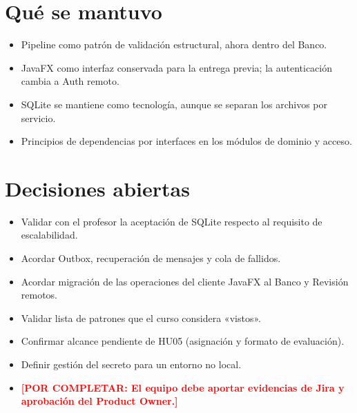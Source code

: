 \documentclass[12pt,a4paper]{article}
\newcommand{\pendiente}[1]{\textcolor{red}{\textbf{[POR COMPLETAR: #1]}}}
\begin{document}
\section{Qué se mantuvo}
\begin{itemize}[leftmargin=*]
\item Pipeline como patrón de validación estructural, ahora dentro del Banco.
\item JavaFX como interfaz conservada para la entrega previa; la autenticación cambia a Auth remoto.
\item SQLite se mantiene como tecnología, aunque se separan los archivos por servicio.
\item Principios de dependencias por interfaces en los módulos de dominio y acceso.
\end{itemize}

\section{Decisiones abiertas}
\begin{itemize}[leftmargin=*]
\item Validar con el profesor la aceptación de SQLite respecto al requisito de escalabilidad.
\item Acordar Outbox, recuperación de mensajes y cola de fallidos.
\item Acordar migración de las operaciones del cliente JavaFX al Banco y Revisión remotos.
\item Validar lista de patrones que el curso considera «vistos».
\item Confirmar alcance pendiente de HU05 (asignación y formato de evaluación).
\item Definir gestión del secreto para un entorno no local.
\item \pendiente{El equipo debe aportar evidencias de Jira y aprobación del Product Owner.}
\end{itemize}
\end{document}
